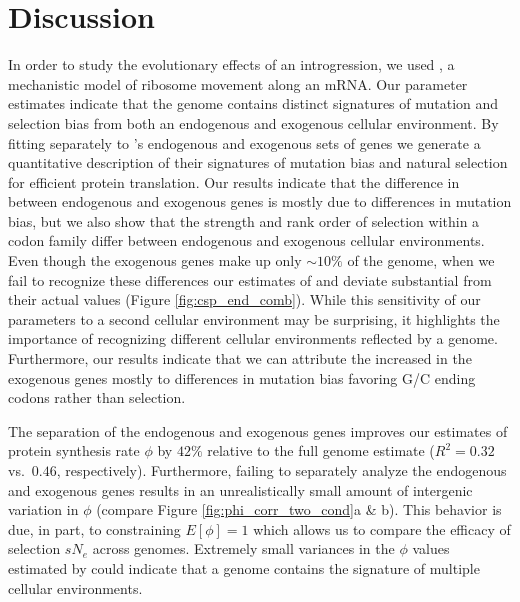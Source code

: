 \documentclass[fleqn,letterpaper]{article}
\begin{document}
\section*{Discussion}
In order to study the evolutionary effects of an introgression, we used \ROC, a mechanistic model of ribosome movement along an mRNA.
Our parameter estimates indicate that the \kluyveri genome contains distinct signatures of mutation and selection bias from both an endogenous and exogenous cellular environment.
By fitting \ROC separately to \kluyveri's endogenous and exogenous sets of genes we generate a quantitative description of their signatures of mutation bias and natural selection for efficient protein translation.
Our results indicate that the difference in \GC between endogenous and exogenous genes is mostly due to differences in mutation bias, but we also show that the strength and rank order of selection within a codon family differ between endogenous and exogenous cellular environments.  
Even though the exogenous genes make up only $\sim10\%$ of the \kluyveri genome, when we fail to recognize these differences our estimates of \DM and \DE deviate substantial from their actual values (Figure \ref{fig:csp_end_comb}).
While this sensitivity of our parameters to a second cellular environment may be surprising, it highlights the importance of recognizing different cellular environments reflected by a genome.
Furthermore, our results indicate that we can attribute the increased \GC in the exogenous genes mostly to differences in mutation bias favoring G/C ending codons rather than selection.

The separation of the endogenous and exogenous genes improves our estimates of protein synthesis rate $\phi$ by $42 \%$ relative to the full genome estimate ($R^2 = 0.32$ vs.~$0.46$, respectively).
Furthermore, failing to separately analyze the endogenous and exogenous genes results in an unrealistically small amount of intergenic variation in $\phi$ (compare Figure \ref{fig:phi_corr_two_cond}a \& b).
This behavior is due, in part, to constraining $E[\phi] = 1$ which allows us to compare the efficacy of selection $sN_e$  across genomes.
Extremely small variances in the $\phi$ values estimated by \ROC could indicate that a genome contains the signature of multiple cellular environments.
\end{document}
